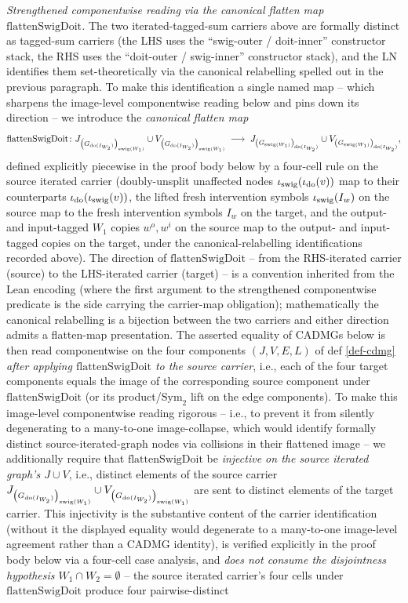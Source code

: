 \documentclass[main]{subfiles}
\providecommand{\flattenSwigDoit}{\mathrm{flattenSwigDoit}}
\begin{document}
\begin{Lem}
    \emph{Strengthened componentwise reading via the canonical flatten map $\flattenSwigDoit$.}
    The two iterated-tagged-sum carriers above are formally distinct as tagged-sum carriers (the LHS uses the ``swig-outer / doit-inner'' constructor stack, the RHS uses the ``doit-outer / swig-inner'' constructor stack), and the LN identifies them set-theoretically via the canonical relabelling spelled out in the previous paragraph. To make this identification a single named map -- which sharpens the image-level componentwise reading below and pins down its direction -- we introduce the \emph{canonical flatten map}
    \[ \flattenSwigDoit \colon J_{\lp G_{\doit(I_{W_2})} \rp_{\swig(W_1)}} \cup V_{\lp G_{\doit(I_{W_2})} \rp_{\swig(W_1)}} \;\longrightarrow\; J_{\lp G_{\swig(W_1)} \rp_{\doit(I_{W_2})}} \cup V_{\lp G_{\swig(W_1)} \rp_{\doit(I_{W_2})}}, \]
    defined explicitly piecewise in the proof body below by a four-cell rule on the source iterated carrier (doubly-unsplit unaffected nodes $\iota_{\mathrm{swig}}(\iota_{\operatorname{do}}(v))$ map to their counterparts $\iota_{\operatorname{do}}(\iota_{\mathrm{swig}}(v))$, the lifted fresh intervention symbols $\iota_{\mathrm{swig}}(I_w)$ on the source map to the fresh intervention symbols $I_w$ on the target, and the output- and input-tagged $W_1$ copies $w^o, w^i$ on the source map to the output- and input-tagged copies on the target, under the canonical-relabelling identifications recorded above). The direction of $\flattenSwigDoit$ -- from the RHS-iterated carrier (source) to the LHS-iterated carrier (target) -- is a convention inherited from the Lean encoding (where the first argument to the strengthened componentwise predicate is the side carrying the carrier-map obligation); mathematically the canonical relabelling is a bijection between the two carriers and either direction admits a flatten-map presentation. The asserted equality of CADMGs below is then read componentwise on the four components $(J, V, E, L)$ of def \ref{def-cdmg} \emph{after applying $\flattenSwigDoit$ to the source carrier}, i.e., each of the four target components equals the image of the corresponding source component under $\flattenSwigDoit$ (or its product/$\mathrm{Sym}_2$ lift on the edge components). To make this image-level componentwise reading rigorous -- i.e., to prevent it from silently degenerating to a many-to-one image-collapse, which would identify formally distinct source-iterated-graph nodes via collisions in their flattened image -- we additionally require that $\flattenSwigDoit$ be \emph{injective on the source iterated graph's $J \cup V$}, i.e., distinct elements of the source carrier $J_{\left ( G_{\operatorname{do}(I_{W_2})} \right )_{\mathrm{swig}(W_1)}} \cup V_{\left ( G_{\operatorname{do}(I_{W_2})} \right )_{\mathrm{swig}(W_1)}}$ are sent to distinct elements of the target carrier. This injectivity is the substantive content of the carrier identification (without it the displayed equality would degenerate to a many-to-one image-level agreement rather than a CADMG identity), is verified explicitly in the proof body below via a four-cell case analysis, and \emph{does not consume the disjointness hypothesis $W_1 \cap W_2 = \emptyset$} -- the source iterated carrier's four cells under $\flattenSwigDoit$ produce four pairwise-distinct 
\end{Lem}
\end{document}
